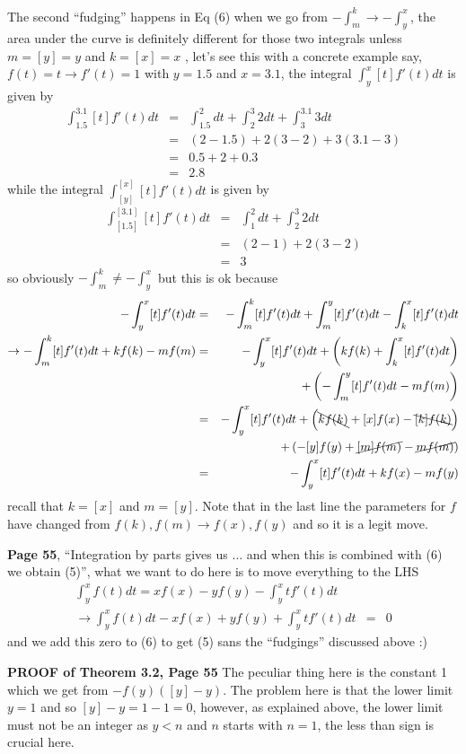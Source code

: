 \documentclass[aps,preprint,preprintnumbers,nofootinbib,showpacs,prd]{revtex4-1}
\newcommand{\nbea}{\begin{eqnarray*}}
\newcommand{\neea}{\end{eqnarray*}}
\begin{document}
The second ``fudging'' happens in Eq (6) when we go from $-\int_m^k \to -\int_y^x$, the area under the curve is definitely different for those two integrals unless $m=[y]=y$ and $k=[x]=x$ , let's see this with a concrete example say, $f(t) = t \to f'(t) = 1$ with $y = 1.5$ and $x = 3.1$, the integral $\int_y^x[t]f'(t)dt$ is given by
%
\nbea
\int_{1.5}^{3.1}[t]f'(t)dt & = & \int_{1.5}^{2}dt + \int_{2}^{3}2dt+  \int_{3}^{3.1}3dt \\
& = & (2-1.5) + 2(3-2) + 3(3.1-3) \\
& = & 0.5 + 2 + 0.3 \\
& = & 2.8
\neea
%
while the integral $\int_{[y]}^{[x]}[t]f'(t)dt$ is given by
%
\nbea
\int_{[1.5]}^{[3.1]}[t]f'(t)dt & = & \int_{1}^{2}dt + \int_{2}^{3}2dt \\
& = & (2-1) + 2(3-2) \\
& = & 3
\neea
%
so obviously $-\int_m^k \neq -\int_y^x$ but this is ok because
%
\nbea
-\int_y^x [t]f'(t)dt & = & -\int_m^k [t]f'(t)dt +\int_m^y [t]f'(t)dt -\int_k^x [t]f'(t)dt \\
\to -\int_m^k [t]f'(t)dt +kf(k) - mf(m) & = & -\int_y^x [t]f'(t)dt + \left ( kf(k) + \int_k^x [t]f'(t)dt\right ) \\
&& + \left (-\int_m^y [t]f'(t)dt - mf(m) \right) \\
& = & -\int_y^x [t]f'(t)dt + \left ( \bcancel{kf(k)} +[x]f(x) - \bcancel{[k]f(k)} \right ) \\
&& + \left (- [y]f(y) + \cancel{[m]f(m)} - \cancel{mf(m)} \right) \\
& = & -\int_y^x [t]f'(t)dt + kf(x) - mf(y)
\neea
%
recall that $k = [x]$ and $m=[y]$. Note that in the last line the parameters for $f$ have changed from $f(k),f(m) \to f(x),f(y)$ and so it is a legit move.

{\bf Page 55}, ``Integration by parts gives us $\dots$ and when this is combined with (6) we obtain (5)'', what we want to do here is to move everything to the LHS
%
\nbea
\int_y^x f(t)dt = xf(x) - yf(y) - \int_y^xtf'(t)dt \\
\to \int_y^x f(t)dt - xf(x) + yf(y) + \int_y^xtf'(t)dt & = & 0
\neea
%
and we add this zero to (6) to get (5) sans the ``fudgings'' discussed above :)

{\bf PROOF of Theorem 3.2, Page 55} The peculiar thing here is the constant 1 which we get from $-f(y)([y]-y)$. The problem here is that the lower limit $y = 1$ and so $[y]-y = 1-1=0$, however, as explained above, the lower limit must not be an integer as $y < n$ and $n$ starts with $n=1$, the less than sign is crucial here.
\end{document}
